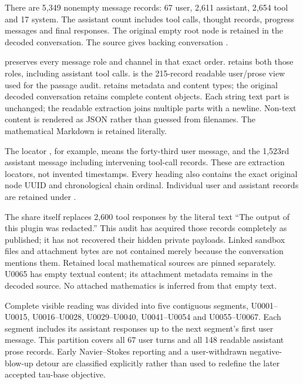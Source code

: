 There are 5,349 nonempty message records: 67 user, 2,611 assistant,
2,654 tool and 17 system. The assistant count includes tool calls,
thought records, progress messages and final responses. The original
empty root node is retained in the decoded conversation. The source
gives backing conversation
\protect{}.

\protect{} preserves every message role and
channel in that exact order. \protect{}
retains both those roles, including assistant tool calls.
\protect{} is the 215-record readable
user/prose view used for the passage audit.
\protect{} retains metadata and content
types; the original decoded conversation retains complete content
objects. Each string text part is unchanged; the readable extraction
joins multiple parts with a newline. Non-text content is rendered as
JSON rather than guessed from filenames. The mathematical Markdown is
retained literally.

The locator \protect{}, for example, means the forty-third
user message, and \protect{} the 1,523rd assistant message
including intervening tool-call records. These are extraction locators,
not invented timestamps. Every heading also contains the exact original
node UUID and chronological chain ordinal. Individual user and assistant
records are retained under \protect{}.

The share itself replaces 2,600 tool responses by the literal text ``The
output of this plugin was redacted.'' This audit has acquired those
records completely as published; it has not recovered their hidden
private payloads. Linked sandbox files and attachment bytes are not
contained merely because the conversation mentions them. Retained local
mathematical sources are pinned separately. U0065 has empty textual
content; its attachment metadata remains in the decoded source. No
attached mathematics is inferred from that empty text.

Complete visible reading was divided into five contiguous segments,
U0001--U0015, U0016--U0028, U0029--U0040, U0041--U0054 and U0055--U0067.
Each segment includes its assistant responses up to the next segment's
first user message. This partition covers all 67 user turns and all 148
readable assistant prose records. Early Navier--Stokes reporting and a
user-withdrawn negative-blow-up detour are classified explicitly rather
than used to redefine the later accepted tau-base objective.

